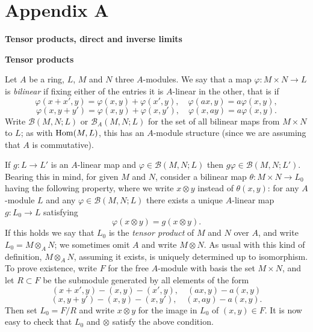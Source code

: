 \chapter*{Appendix A}
\renewcommand{\thetheorem}{A\arabic{theorem}}
\setcounter{theorem}{0}

\vspace*{-0.5cm}
\begin{center}
  {\Large\bfseries Tensor products, direct and inverse limits}
\end{center}
\vspace{0.3cm}

\medskip
\noindent\textbf{Tensor products}

Let $A$ be a ring, $L$, $M$ and $N$ three $A$-modules. We say that a map
$\varphi\colon M \times N \to L$ is \emph{bilinear} if fixing either of the entries it is $A$-linear
in the other, that is if
\[
  \varphi(x + x', y) = \varphi(x, y) + \varphi(x', y), \quad \varphi(ax, y) = a\varphi(x, y),
\]
\[
  \varphi(x, y + y') = \varphi(x, y) + \varphi(x, y'), \quad \varphi(x, ay) = a\varphi(x, y).
\]
Write $\mathcal{B}(M, N; L)$ or $\mathcal{B}_A(M, N; L)$ for the set of all bilinear maps from
$M \times N$ to $L$; as with $\operatorname{Hom}(M, L)$, this has an $A$-module structure (since we are
assuming that $A$ is commutative).

If $g\colon L \to L'$ is an $A$-linear map and $\varphi \in \mathcal{B}(M, N; L)$ then
$g\varphi \in \mathcal{B}(M, N; L')$. Bearing this in mind, for given $M$ and $N$, consider a
bilinear map $\theta\colon M \times N \to L_0$ having the following property, where we write
$x \otimes y$ instead of $\theta(x, y)$: for any $A$-module $L$ and any $\varphi \in \mathcal{B}(M, N; L)$
there exists a unique $A$-linear map $g\colon L_0 \to L$ satisfying
\[
  \varphi(x \otimes y) = g(x \otimes y).
\]
If this holds we say that $L_0$ is the \emph{tensor product} of $M$ and $N$ over $A$, and
write $L_0 = M \otimes_A N$; we sometimes omit $A$ and write $M \otimes N$. As usual with
this kind of definition, $M \otimes_A N$, assuming it exists, is uniquely determined
up to isomorphism. To prove existence, write $F$ for the free $A$-module with
basis the set $M \times N$, and let $R \subset F$ be the submodule generated by all
elements of the form
\[
  (x + x', y) - (x, y) - (x', y), \quad (ax, y) - a(x, y)
\]
\[
  (x, y + y') - (x, y) - (x, y'), \quad (x, ay) - a(x, y).
\]
Then set $L_0 = F/R$ and write $x \otimes y$ for the image in $L_0$ of $(x, y) \in F$. It is now
easy to check that $L_0$ and $\otimes$ satisfy the above condition.


